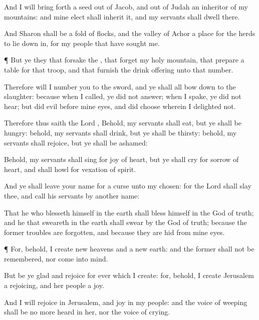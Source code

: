 {And I will bring
forth a
seed out of
Jacob, and out of
Judah an
inheritor of my
mountains: and mine
elect shall
inherit it, and my
servants shall
dwell there.

And
Sharon shall be a
fold of
flocks, and the
valley of
Achor a place for the
herds to lie down
in, for my
people that have
sought me.


\par }{\PP {}¶ But ye
{} they that
forsake the
{}, that
forget my
holy
mountain, that
prepare a
table for that
troop, and that
furnish the drink
offering unto that
number.

Therefore will I
number you to the
sword, and ye shall all bow
down to the
slaughter: because when I
called, ye did not
answer; when I
spake, ye did not
hear; but
did
evil before mine
eyes, and did
choose
{} wherein I
delighted not.

Therefore thus
saith the
Lord
{}, Behold, my
servants shall
eat, but ye shall be
hungry: behold, my
servants shall
drink, but ye shall be
thirsty: behold, my
servants shall
rejoice, but ye shall be
ashamed:

Behold, my
servants shall
sing for
joy of
heart, but ye shall
cry for
sorrow of
heart, and shall
howl for
vexation of
spirit.

And ye shall
leave your
name for a
curse unto my
chosen: for the
Lord
{} shall
slay thee, and
call his
servants by
another
name:

That he who
blesseth himself in the
earth shall
bless himself in the
God of
truth; and he that
sweareth in the
earth shall
swear by the
God of
truth; because the
former
troubles are
forgotten, and because they are
hid from mine
eyes.


\par }{\PP {}¶ For, behold, I
create
new
heavens and a
new
earth: and the
former shall not be
remembered, nor
come into
mind.

But be ye
glad and
rejoice for
ever
{} which I
create: for, behold, I
create
Jerusalem a
rejoicing, and her
people a
joy.

And I will
rejoice in
Jerusalem, and
joy in my
people: and the
voice of
weeping shall be no more
heard in her, nor the
voice of
crying.

}
